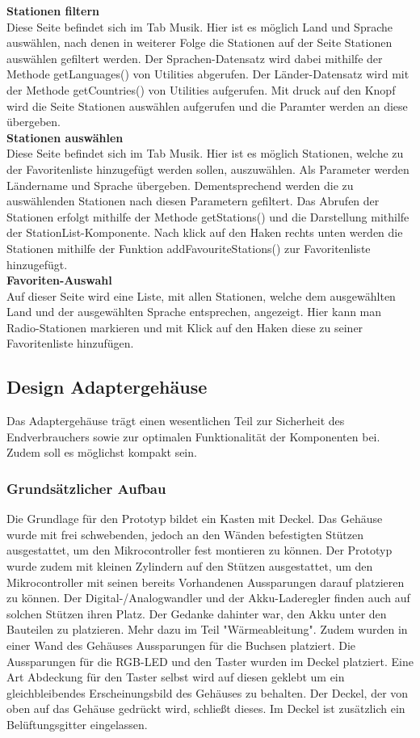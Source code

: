 \documentclass[11pt, twoside]{article}
\begin{document}
\textbf{Stationen filtern} \\
Diese Seite befindet sich im Tab Musik. Hier ist es möglich Land und Sprache auswählen, nach denen in weiterer Folge die Stationen auf der Seite Stationen auswählen gefiltert werden. Der Sprachen-Datensatz wird dabei mithilfe der Methode getLanguages() von Utilities abgerufen. Der Länder-Datensatz wird mit der Methode getCountries() von Utilities aufgerufen. Mit druck auf den Knopf wird die Seite Stationen auswählen aufgerufen und die Paramter werden an diese übergeben. \newline \\
\textbf{Stationen auswählen} \\
Diese Seite befindet sich im Tab Musik. Hier ist es möglich Stationen, welche zu der Favoritenliste hinzugefügt werden sollen, auszuwählen. Als Parameter werden Ländername und Sprache übergeben. Dementsprechend werden die zu auswählenden Stationen nach diesen Parametern gefiltert. Das Abrufen der Stationen erfolgt mithilfe der Methode getStations() und die Darstellung mithilfe der StationList-Komponente. Nach klick auf den Haken rechts unten werden die Stationen mithilfe der Funktion addFavouriteStations() zur Favoritenliste hinzugefügt. \newline \\
\textbf{Favoriten-Auswahl} \\
Auf dieser Seite wird eine Liste, mit allen Stationen, welche dem ausgewählten Land und der ausgewählten Sprache entsprechen, angezeigt. Hier kann man Radio-Stationen markieren und mit Klick auf den Haken diese zu seiner Favoritenliste hinzufügen. \newline \\
\subsection{Design Adaptergehäuse}
Das Adaptergehäuse trägt einen wesentlichen Teil zur Sicherheit des Endverbrauchers sowie zur optimalen Funktionalität der Komponenten bei. Zudem soll es möglichst kompakt sein.
\subsubsection{Grundsätzlicher Aufbau}
Die Grundlage für den Prototyp bildet ein Kasten mit Deckel.\newline
Das Gehäuse wurde mit frei schwebenden, jedoch an den Wänden befestigten Stützen ausgestattet, um den Mikrocontroller fest montieren zu können. Der Prototyp wurde zudem mit kleinen Zylindern auf den Stützen ausgestattet, um den Mikrocontroller mit seinen bereits Vorhandenen Aussparungen darauf platzieren zu können. Der Digital-/Analogwandler und der Akku-Laderegler finden auch auf solchen Stützen ihren Platz. Der Gedanke dahinter war, den Akku unter den Bauteilen zu platzieren. Mehr dazu im Teil "Wärmeableitung". Zudem wurden in einer Wand des Gehäuses Aussparungen für die Buchsen platziert. Die Aussparungen für die RGB-LED und den Taster wurden im Deckel platziert. Eine Art Abdeckung für den Taster selbst wird auf diesen geklebt um ein gleichbleibendes Erscheinungsbild des Gehäuses zu behalten. Der Deckel, der von oben auf das Gehäuse gedrückt wird, schließt dieses. Im Deckel ist zusätzlich ein Belüftungsgitter eingelassen.
\end{document}
